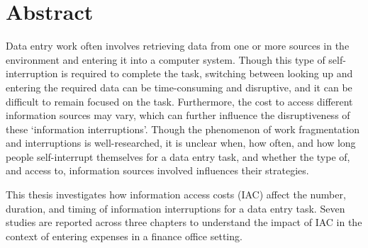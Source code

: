 \chapter*{Abstract}
Data entry work often involves retrieving data from one or more sources in the environment and entering it into a computer system. Though this type of self-interruption is required to complete the task, switching between looking up and entering the required data can be time-consuming and disruptive, and it can be difficult to remain focused on the task. Furthermore, the cost to access different information sources may vary, which can further influence the disruptiveness of these `information interruptions'. Though the phenomenon of work fragmentation and interruptions is well-researched, it is unclear when, how often, and how long people self-interrupt themselves for a data entry task, and whether the type of, and access to, information sources involved influences their strategies.


This thesis investigates how information access costs (IAC) affect the number, duration, and timing of information interruptions for a data entry task. Seven studies are reported across three chapters to understand the impact of IAC in the context of entering expenses in a finance office setting. 

